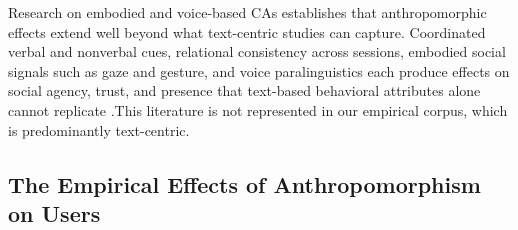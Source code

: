 \documentclass[lettersize,journal]{IEEEtran}
\begin{document}

Research on embodied and voice-based CAs establishes that anthropomorphic effects extend well beyond what text-centric studies can capture. Coordinated verbal and nonverbal cues, relational consistency across sessions, embodied social signals such as gaze and gesture, and voice paralinguistics each produce effects on social agency, trust, and presence that text-based behavioral attributes alone cannot replicate \cite{cassell2000embodied,bickmore2005relational,kramer2003socially,clark2019makes}.This literature is not represented in our empirical corpus, which is predominantly text-centric. 





\subsection{The Empirical Effects of Anthropomorphism on Users}

\end{document}
